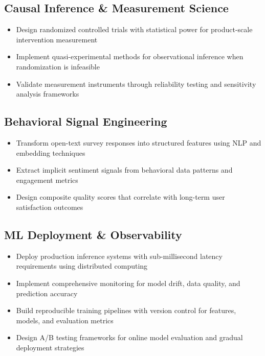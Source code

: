 \documentclass[11pt,a4paper]{article}
\begin{document}
\subsection*{Causal Inference \& Measurement Science}
\begin{itemize}
    \item Design randomized controlled trials with statistical power for product-scale intervention measurement
    \item Implement quasi-experimental methods for observational inference when randomization is infeasible
    \item Validate measurement instruments through reliability testing and sensitivity analysis frameworks
\end{itemize}

\subsection*{Behavioral Signal Engineering}
\begin{itemize}
    \item Transform open-text survey responses into structured features using NLP and embedding techniques
    \item Extract implicit sentiment signals from behavioral data patterns and engagement metrics
    \item Design composite quality scores that correlate with long-term user satisfaction outcomes
\end{itemize}

\subsection*{ML Deployment \& Observability}
\begin{itemize}
    \item Deploy production inference systems with sub-millisecond latency requirements using distributed computing
    \item Implement comprehensive monitoring for model drift, data quality, and prediction accuracy
    \item Build reproducible training pipelines with version control for features, models, and evaluation metrics
    \item Design A/B testing frameworks for online model evaluation and gradual deployment strategies
\end{itemize}
\end{document}
